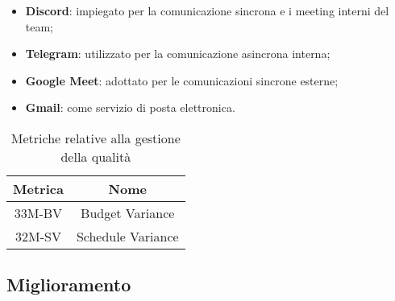 \begin{itemize}
    \item \textbf{Discord}: impiegato per la comunicazione sincrona e i meeting interni del team;
    \item \textbf{Telegram}: utilizzato per la comunicazione asincrona interna;
    \item \textbf{Google Meet}: adottato per le comunicazioni sincrone esterne;
    \item \textbf{Gmail}: come servizio di posta elettronica.
\end{itemize}

\begin{table}[h]
	\centering
	\begin{tabular}{|c|c|}
		\hline
		\textbf{Metrica} & \textbf{Nome}                   \\
		\hline
		33M-BV           & Budget Variance                 \\
		32M-SV           & Schedule Variance               \\
		\hline
	\end{tabular}
	\caption{Metriche relative alla gestione della qualità}
    \label{tab:1}
\end{table}

\subsection{Miglioramento}
